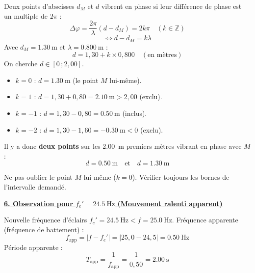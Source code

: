 \documentclass[11pt]{article}
\begin{document}
\begin{exoresolu}
Deux points d'abscisses $d_M$ et $d$ vibrent en phase si leur différence de phase est un multiple de $2\pi$ :
\[ \Delta\varphi = \frac{2\pi}{\lambda}(d - d_M) = 2k\pi \quad (k \in \mathbb{Z}) \]
\[ \iff d - d_M = k\lambda \]
Avec $d_M = \SI{1,30}{\meter}$ et $\lambda = \SI{0,800}{\meter}$ :
\[ d = 1,30 + k \times 0,800 \quad (\text{en mètres}) \]
On cherche $d \in [0\,; 2,00]$.

\begin{itemize}
    \item $k = 0$ : $d = \SI{1,30}{\meter}$ (le point $M$ lui-même).
    \item $k = 1$ : $d = 1,30 + 0,80 = \SI{2,10}{\meter} > 2,00$ (exclu).
    \item $k = -1$ : $d = 1,30 - 0,80 = \SI{0,50}{\meter}$ (inclus).
    \item $k = -2$ : $d = 1,30 - 1,60 = -\SI{0,30}{\meter} < 0$ (exclu).
\end{itemize}
Il y a donc \textbf{deux points} sur les \SI{2,00}{\meter} premiers mètres vibrant en phase avec $M$ :
\[ \boxed{d = \SI{0,50}{\meter} \quad \text{et} \quad d = \SI{1,30}{\meter}} \]
\begin{attention}[Vigilance]
Ne pas oublier le point $M$ lui-même ($k=0$). Vérifier toujours les bornes de l'intervalle demandé.
\end{attention}

\underline{\textbf{6. Observation pour $f_e' = \SI{24,5}{\hertz}$ (Mouvement ralenti apparent)}}

Nouvelle fréquence d'éclairs $f_e' = \SI{24,5}{\hertz} < f = \SI{25,0}{\hertz}$.
Fréquence apparente (fréquence de battement) :
\[ f_{\text{app}} = |f - f_e'| = |25,0 - 24,5| = \SI{0,50}{\hertz} \]
Période apparente :
\[ T_{\text{app}} = \frac{1}{f_{\text{app}}} = \frac{1}{0,50} = \SI{2,00}{\second} \]


\end{exoresolu}
\end{document}
